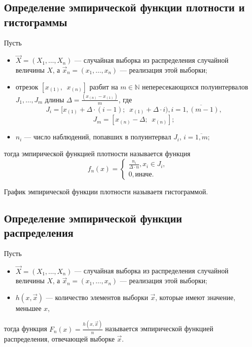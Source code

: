 \subsection{Определение эмпирической функции плотности и гистограммы}
Пусть
\begin{itemize}
    \item \( \vec{X} = (X_1, \ldots, X_n) \) --- случайная выборка из распределения случайной
        величины \( X \), а \( \vec{x}_n = (x_1, \ldots, x_n) \) --- реализация этой выборки;
    \item отрезок \( [x_{(1)}, \enspace x_{(n)} ] \) разбит на \( m \in \mathbb{N} \) непересекающихся полуинтервалов
        \( J_1, \ldots, J_m \)  длины \( \Delta = \frac{(x_{(n)} - x_{(1)})}{m} \), где
        \begin{equation*}
            J_i = [x_{(1)} + \Delta \cdot (i - 1); \enspace x_{(1)} + \Delta \cdot i ), i = \overline{1, (m - 1)},
        \end{equation*} 
        \begin{equation*}
            J_m = [x_{(n)} - \Delta; \enspace x_{(n)}];
        \end{equation*}
    \item \( n_i \) --- число наблюдений, попавших в полуинтервал \( J_i \), \( i = \overline{1, m} \);
\end{itemize}
тогда эмпирической функцией плотности называется функция
\begin{equation*}
    f_n(x) =
     \begin{cases}
        \frac{n_i}{\Delta \cdot n}, x_i \in J_i, \\
        0, \text{иначе}. 
    \end{cases}
\end{equation*}

График эмпирической функции плотности называетя гистограммой.

\subsection{Определение эмпирической функции распределения}
Пусть
\begin{itemize}
    \item \( \vec{X} = (X_1, \ldots, X_n) \) --- случайная выборка из распределения случайной
        величины \( X \), а \( \vec{x}_n = (x_1, \ldots, x_n) \) --- реализация этой выборки;
    \item \( h(x, \vec{x}) \) --- количество элементов выборки \( \vec{x} \), 
        которые имеют значение, меньшее \( x \),
\end{itemize}
тогда функция \( F_n(x) = \frac{h(x, \vec{x})}{n} \) называется эмпирической функцией
распределения, отвечающей выборке \( \vec{x} \). 